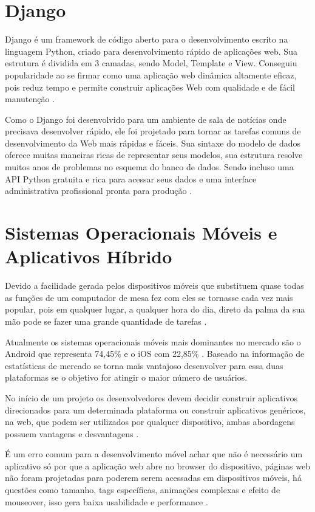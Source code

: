 \documentclass{ifto-tex}
\begin{document}
	
	\section{Django}
Django é um framework de código aberto para o desenvolvimento escrito na linguagem Python, criado para desenvolvimento rápido de aplicações web.  Sua estrutura é dividida em 3 camadas, sendo Model, Template e View. Conseguiu popularidade ao se firmar como uma aplicação web dinâmica altamente eficaz, pois reduz tempo e permite construir aplicações Web com qualidade e de fácil manutenção \cite{badindesenvolvimento}.

Como o Django foi desenvolvido para um ambiente de sala de notícias onde precisava desenvolver rápido, ele foi projetado para tornar as tarefas comuns de desenvolvimento da Web mais rápidas e fáceis. Sua sintaxe do modelo de dados oferece muitas maneiras ricas de representar seus modelos, sua estrutura resolve muitos anos de problemas no esquema do banco de dados. Sendo incluso uma API Python gratuita e rica para acessar seus dados e uma interface administrativa profissional pronta para produção \cite{Djangoem92:online}.

	
	\section{Sistemas Operacionais Móveis e Aplicativos Híbrido}
	Devido a facilidade gerada pelos dispositivos móveis que substituem quase todas as funções de um computador de mesa fez com eles se tornasse cada vez mais popular, pois em qualquer lugar, a qualquer hora do dia, direto da palma da sua mão pode se fazer uma grande quantidade de tarefas \cite{Sistemas41:online}.
	
	Atualmente os sistemas operacionais móveis mais dominantes no mercado são o Android que representa 74,45\% e o iOS com 22,85\% \cite{iOSvsAnd26:online}. Baseado na informação de estatísticas de mercado se torna mais vantajoso desenvolver para essa duas plataformas se o objetivo for atingir o maior número de usuários.
	
	No início de um projeto os desenvolvedores devem decidir construir aplicativos direcionados para um determinada plataforma ou construir aplicativos genéricos, na web, que podem ser utilizados por qualquer dispositivo, ambas abordagens possuem vantagens e desvantagens \cite{Aplicaco50:online}.
	
	É um erro comum para a desenvolvimento móvel achar que não é necessário um aplicativo só por que a aplicação web abre no browser do dispositivo, páginas web não foram projetadas para poderem serem acessadas em dispositivos móveis, há questões como tamanho, tags específicas, animações complexas e efeito de mouseover, isso gera baixa usabilidade e performance \cite{Introduc9:online}.
	
\end{document}
